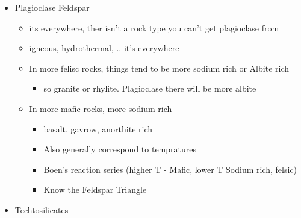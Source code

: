 \documentclass[11pt]{article}
\begin{document}
\begin{itemize}
\item Plagioclase Feldspar
\begin{itemize}
\item its everywhere, ther isn't a rock type you can't get plagioclase from
\item igneous, hydrothermal, .. it's everywhere
\item In more felisc rocks, things tend to be more sodium rich or Albite rich
\begin{itemize}
\item so granite or rhylite. Plagioclase there will be more albite
\end{itemize}
\item In more mafic rocks, more sodium rich
\begin{itemize}
\item basalt, gavrow, anorthite rich
\item Also generally correspond to tempratures
\item Boen's reaction series (higher T - Mafic, lower T Sodium rich, felsic)
\item Know the Feldspar Triangle
\end{itemize}
\end{itemize}
\item Techtosilicates
\end{itemize}
\end{document}
